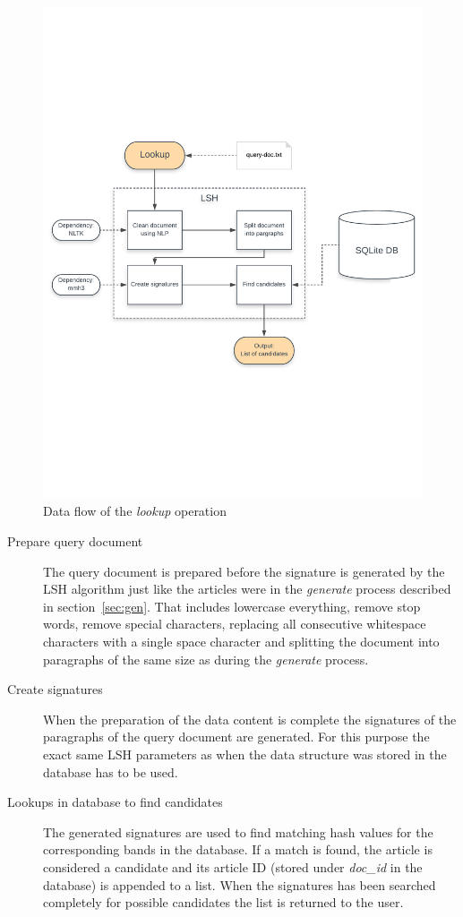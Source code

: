 \begin{figure}[ht]
	\centering
    \includegraphics[width = \linewidth]{docs/report/input/lookup.pdf}
    \captionsetup{width = \linewidth}
    \caption{Data flow of the \emph{lookup} operation}
    \label{fig:lookup}
\end{figure}

\begin{description}
    \item[Prepare query document] The query document is prepared before the signature is generated by the LSH algorithm just like the articles were in the \emph{generate} process described in section~\ref{sec:gen}. That includes lowercase everything, remove stop words, remove special characters, replacing all consecutive whitespace characters with a single space character and splitting the document into paragraphs of the same size as during the \emph{generate} process.
    \item[Create signatures] When the preparation of the data content is complete the signatures of the paragraphs of the query document are generated. For this purpose the exact same LSH parameters as when the data structure was stored in the database has to be used.
    \item[Lookups in database to find candidates] The generated signatures are used to find matching hash values for the corresponding bands in the database. If a match is found, the article is considered a candidate and its article ID (stored under \emph{doc\_id} in the database) is appended to a list. When the signatures has been searched completely for possible candidates the list is returned to the user.
\end{description}